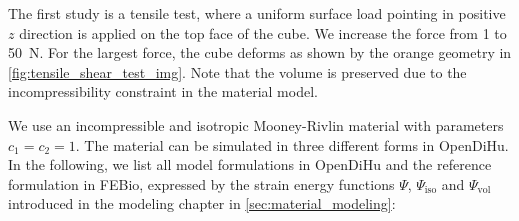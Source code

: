 The first study is a tensile test, where a uniform surface load pointing in positive $z$ direction is applied on the top face of the cube. We increase the force from 1 to \SI{50}{\newton}. For the largest force, the cube deforms as shown by the orange geometry in \cref{fig:tensile_shear_test_img}. Note that the volume is preserved due to the incompressibility constraint in the material model.

We use an incompressible and isotropic Mooney-Rivlin material with parameters $c_1=c_2=1$. The material can be simulated in three different forms in OpenDiHu. In the following, we list all model formulations in OpenDiHu and the reference formulation in FEBio,
expressed by the strain energy functions $\Psi$, $\Psi_\text{iso}$ and $\Psi_\text{vol}$ introduced in the modeling chapter in \cref{sec:material_modeling}:

